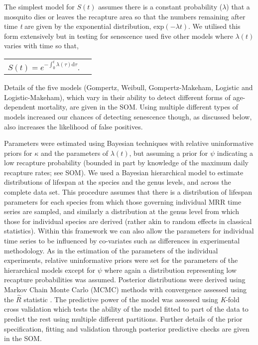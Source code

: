 \documentclass[]{article}
\begin{document}
The simplest model for $S(t)$ assumes there is a constant
probability ($\lambda$) that a mosquito dies or leaves the recapture area
so that the numbers remaining after time \emph{t} are given by the
exponential distribution, $\text{exp}( -\lambda t )$.
We utilised this form extensively but in testing for senescence used
five other models where $\lambda(t)$ varies with time so that,

\begin{longtable}[]{@{}ll@{}}
\(S\left( t \right) = e^{- \int_{0}^{t}{\lambda\left( \tau \right) \mathrm{d}\tau}}.\)
\end{longtable}

Details of the five models (Gompertz, Weibull, Gompertz-Makeham,
Logistic and Logistic-Makeham), which vary in their ability to detect
different forms of age-dependent mortality, are given in the SOM. Using
multiple different types of models increased our chances of detecting
senescence though, as discussed below, also increases the likelihood of
false positives.

Parameters were estimated using Bayesian techniques with relative
uninformative priors for $\kappa$ and the parameters of
$\lambda(t)$, but assuming a prior for $\psi$ indicating a low
recapture probability (bounded in part by knowledge of the maximum daily
recapture rates; see SOM). We used a Bayesian hierarchical model to estimate
distributions of lifespan at the species and the genus levels, and
across the complete data set. This procedure assumes that there is a
distribution of lifespan parameters for each species from which those
governing individual MRR time series are sampled, and similarly a
distribution at the genus level from which those for individual species
are derived (rather akin to random effects in classical statistics).
Within this framework we can also allow the parameters for individual
time series to be influenced by co-variates such as differences in
experimental methodology. As in the estimation of the parameters of the
individual experiments, relative uninformative priors were set for the
parameters of the hierarchical models except for $\psi$ where again a
distribution representing low recapture probabilities was assumed.
Posterior distributions were derived using Markov Chain Monte Carlo
(MCMC) methods with convergence assessed using the \(\hat{R}\) statistic
\citep{gelman1992inference}. The predictive power of the model was assessed
using \emph{K}-fold cross validation which tests the ability of the
model fitted to part of the data to predict the rest using multiple
different partitions. Further details of the prior specification,
fitting and validation through posterior predictive checks \citep{lambert2018student} are given in
the SOM.
\end{document}
